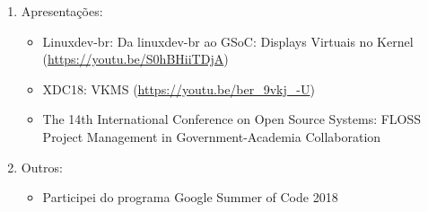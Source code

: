 \begin{enumerate}
  \item Apresentações:
    \begin{itemize}
      \item Linuxdev-br: Da linuxdev-br ao GSoC: Displays Virtuais no Kernel (\url{https://youtu.be/S0hBHiiTDjA})
      \item XDC18: VKMS (\url{https://youtu.be/ber_9vkj_-U})
      \item The 14th International Conference on Open Source Systems: FLOSS Project Management in Government-Academia Collaboration
    \end{itemize}

  \item Outros:
    \begin{itemize}
      \item Participei do programa Google Summer of Code 2018
    \end{itemize}
\end{enumerate}
